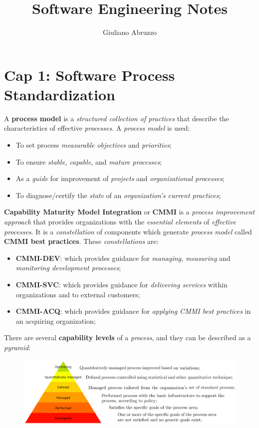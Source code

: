 \documentclass{article}
\author{Giuliano Abruzzo}
\title{Software Engineering Notes}
\begin{document}
\maketitle
\newpage
\tableofcontents
\newpage
\section{Cap 1: Software Process Standardization}
A \textbf{process model} is a \emph{structured collection of practices} that describe the characteristics of effective \emph{processes}. A \emph{process model} is used:
\begin{itemize}
\item To set process \emph{measurable objectives} and \emph{priorities};
\item To ensure \emph{stable, capable}, and \emph{mature processes};
\item As a \emph{guide} for improvement of \emph{projects} and \emph{organizational processes};
\item To diagnose/certify the \emph{state} of an \emph{organization's current practices};
\end{itemize}
\textbf{Capability Maturity Model Integration} or \textbf{CMMI} is a \emph{process improvement approach} that provides organizations with the \emph{essential elements} of \emph{effective processes}. It is a \emph{constellation} of components which generate \emph{process model} called \textbf{CMMI best practices}. These \emph{constellations} are:
\begin{itemize}
\item \textbf{CMMI-DEV}: which provides guidance for \emph{managing, measuring} and \emph{monitoring development processes};  
\item \textbf{CMMI-SVC}: which provides guidance for \emph{delivering services} within organizations and to external customers;
\item \textbf{CMMI-ACQ}: which provides guidance for \emph{applying CMMI best practices} in an acquiring organization;
\end{itemize} 
There are several \textbf{capability levels} of a \emph{process}, and they can be described as a \emph{pyramid}:
\begin{figure}[H]
  \centering
  \includegraphics[scale=1.1]{cattura.png}
\end{figure}
\end{document}
